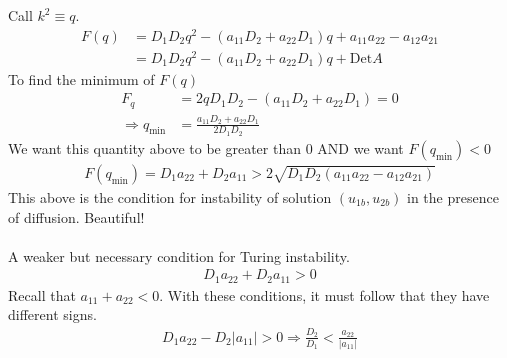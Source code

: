 \documentclass[12pt, letterpaper]{article}
\begin{document}
Call $k^2 \equiv q$.
\begin{align*}
    F(q) &= D_1D_2q^2 - (a_{11}D_2 + a_{22}D_1)q + a_{11}a_{22} - a_{12}a_{21}  \\
    &= D_1D_2 q^2 - (a_{11}D_2 + a_{22}D_1)q + \text{Det} A
\end{align*}
To find the minimum of $F(q)$
\begin{align*}
    F_q &= 2qD_1D_2 - (a_{11}D_2 + a_{22}D_1) = 0 \\
    \Rightarrow q_{\text{min}} &= \frac{a_{11}D_2 + a_{22}D_1}{2D_1D_2}
\end{align*}
We want this quantity above to be greater than 0 AND we want $F(q_{\text{min}}) < 0$
\begin{align*}
    F(q_{\text{min}}) = D_1a_{22} + D_2a_{11} > 2\sqrt{D_1D_2 (a_{11}a_{22} - a_{12}a_{21})}
\end{align*}
This above is the condition for instability of solution $(u_{1b},u_{2b})$ in the presence 
of diffusion. Beautiful! \\ \\ 
A weaker but necessary condition for Turing instability.
\begin{align*}
    D_1a_{22} + D_2 a_{11} > 0
\end{align*}
Recall that $a_{11} + a_{22} < 0$. With these conditions, it must follow that they have different 
signs.
\begin{align*}
    D_1 a_{22} - D_2|a_{11}| > 0 \Rightarrow \frac{D_2}{D_1} < \frac{a_{22}}{|a_{11}|}
\end{align*}
\end{document}
